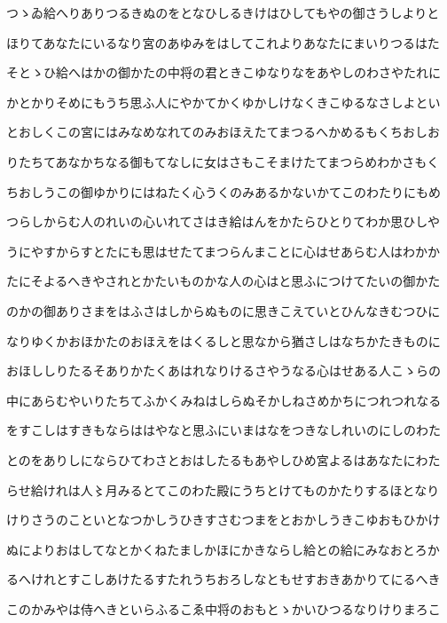 \documentclass[a4paper,11pt,landscape]{ltjtarticle}
\begin{document}
\par\medskip
つゝゐ給へりありつるきぬのをとなひしるきけはひしてもやの御さうしよりと
\par\medskip
ほりてあなたにいるなり宮のあゆみをはしてこれよりあなたにまいりつるはた
\par\medskip
そとゝひ給へはかの御かたの中将の君ときこゆなりなをあやしのわさやたれに
\par\medskip
かとかりそめにもうち思ふ人にやかてかくゆかしけなくきこゆるなさしよとい
\par\medskip
とおしくこの宮にはみなめなれてのみおほえたてまつるへかめるもくちおしお
\par\medskip
りたちてあなかちなる御もてなしに女はさもこそまけたてまつらめわかさもく
\par\medskip
ちおしうこの御ゆかりにはねたく心うくのみあるかないかてこのわたりにもめ
\par\medskip
つらしからむ人のれいの心いれてさはき給はんをかたらひとりてわか思ひしや
\par\medskip
うにやすからすとたにも思はせたてまつらんまことに心はせあらむ人はわかか
\par\medskip
たにそよるへきやされとかたいものかな人の心はと思ふにつけてたいの御かた
\par\medskip
のかの御ありさまをはふさはしからぬものに思きこえていとひんなきむつひに
\par\medskip
なりゆくかおほかたのおほえをはくるしと思なから猶さしはなちかたきものに
\par\medskip
おほししりたるそありかたくあはれなりけるさやうなる心はせある人こゝらの
\par\medskip
中にあらむやいりたちてふかくみねはしらぬそかしねさめかちにつれつれなる
\par\medskip
をすこしはすきもならははやなと思ふにいまはなをつきなしれいのにしのわた
\par\medskip
とのをありしにならひてわさとおはしたるもあやしひめ宮よるはあなたにわた
\par\medskip
らせ給けれは人〻月みるとてこのわた殿にうちとけてものかたりするほとなり
\par\medskip
けりさうのこといとなつかしうひきすさむつまをとおかしうきこゆおもひかけ
\par\medskip
ぬによりおはしてなとかくねたましかほにかきならし給との給にみなおとろか
\par\medskip
るへけれとすこしあけたるすたれうちおろしなともせすおきあかりてにるへき
\par\medskip
このかみやは侍へきといらふるこゑ中将のおもとゝかいひつるなりけりまろこ
\end{document}
